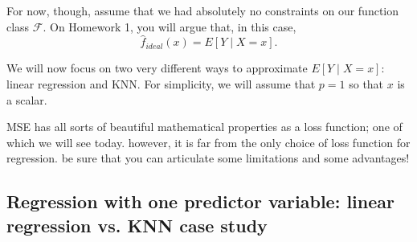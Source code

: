 For now, though, assume that we had absolutely no constraints on our function class $\mathcal{F}$. On Homework 1, you will argue that, in this case, 
$$
\hat{f}_{ideal}(x) = E[Y \mid X=x].
$$

We will now focus on two very different ways to approximate $E[Y \mid X=x]$: linear regression and KNN. For simplicity, we will assume that $p=1$ so that $x$ is a scalar. 

MSE has all sorts of beautiful mathematical properties as a loss function; one of which we will see today. however, it is far from the only choice of loss function for regression. be sure that you can articulate some limitations and some advantages!

\subsection{Regression with one predictor variable: linear regression vs. KNN case study}

